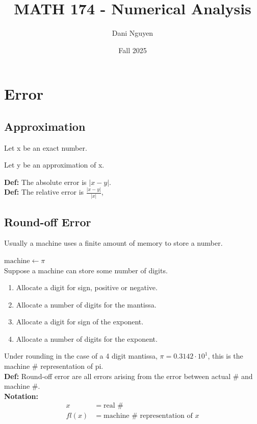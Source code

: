 \documentclass[12pt, letterpaper]{article}
\title{MATH 174 - Numerical Analysis}
\author{Dani Nguyen}
\date{Fall 2025}
\begin{document}
\maketitle
\tableofcontents

\section{Error}
\subsection{Approximation}
\noindent Let x be an exact number.

\noindent Let y be an approximation of x.

\noindent \textbf{Def:} The absolute error is $|x-y|$. \\
\textbf{Def:} The relative error is $\displaystyle \frac{|x-y|}{|x|}$, 


\subsection{Round-off Error}
Usually a machine uses a finite amount of memory to store a number.

$\text{machine} \leftarrow \pi$
\\
Suppose a machine can store some number of digits. 
\begin{enumerate}[1.]
    \item Allocate a digit for sign, positive or negative.
    \item Allocate a number of digits for the mantissa.
    \item Allocate a digit for sign of the exponent.
    \item Allocate a number of digits for the exponent.
\end{enumerate}

\noindent Under rounding in the case of a 4 digit mantissa, $\pi = 0.3142 \cdot 10^1$, this is the machine $\#$ representation of pi. \\

\noindent \textbf{Def:} Round-off error are all errors arising from the error between actual $\#$ and machine $\#$. \\

\noindent \textbf{Notation:} 
\begin{align*}
x &= \text{real } \# \\
fl(x) &= \text{machine } \# \text{ representation of } x
\end{align*}
\end{document}
